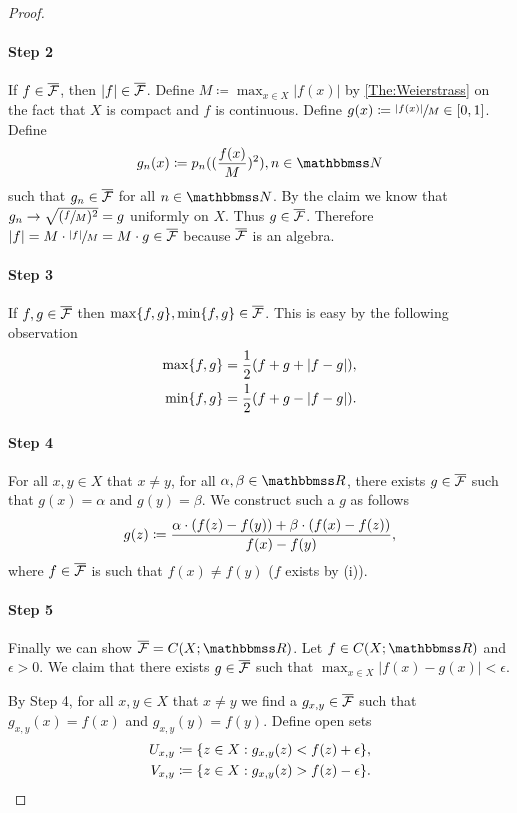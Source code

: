 \documentclass[screen,single]{techreport}
\numberwithin{equation}{section}
\begin{document}
\begin{proof}
  \paragraph{Step 2} If $f \in \overline{\mathcal{F}}$, then $|f| \in \overline{\mathcal{F}}$.
  Define $M \coloneqq \max_{x \in X} |f(x)|$ by \cref{The:Weierstrass} on the fact that $X$ is compact and $f$ is continuous.
  Define $g(x) \coloneqq \sfrac{|f(x)|}{M} \in [0,1]$.
  Define
  \[
  g_n(x) \coloneqq p_n\p{ \p{\frac{f(x)}{M}}^2 }, n \in \bbN
  \]
  such that $g_n \in \overline{\mathcal{F}}$ for all $n \in \bbN$.
  By the claim we know that $g_n \rightarrow \sqrt{({\sfrac{f}{M} })^2} = g$ uniformly on $X$.
  Thus $g \in \overline{\mathcal{F}}$. Therefore $|f| = M \cdot \sfrac{|f|}{M} = M \cdot g \in \overline{\mathcal{F}}$ because $\overline{\mathcal{F}}$ is an algebra.
  
  \paragraph{Step 3} If $f,g\in \overline{\mathcal{F}}$ then $\max\{f,g\},\min\{f,g\} \in \overline{\mathcal{F}}$.
  This is easy by the following observation
  \begin{align*}
    \max\{f,g\} & = \frac{1}{2} ({ f+g+|f-g| }), \\
    \min\{f,g\} & = \frac{1}{2} ({ f+g - |f-g| }).
  \end{align*}
  
  \paragraph{Step 4} For all $x,y \in X$ that $x \neq y$, for all $\alpha,\beta \in \bbR$, there exists $g \in \overline{\mathcal{F}}$ such that $g(x) = \alpha$ and $g(y) = \beta$.
  We construct such a $g$ as follows
  \[
  g(z) \coloneqq \frac{\alpha \cdot ({f(z) - f(y)}) + \beta \cdot ({ f(x) - f(z) })}{f(x) - f(y)},
  \]
  where $f \in \overline{\mathcal{F}}$ is such that $f(x) \neq f(y)$ ($f$ exists by (i)).
  
  \paragraph{Step 5} Finally we can show $\overline{\calF} = C(X;\bbR)$.
  Let $f \in C(X;\bbR)$ and $\epsilon > 0$.
  We claim that there exists $g \in \overline{\mathcal{F}}$ such that $\max_{x \in X} |f(x) -  g(x)| < \epsilon$.
  
  By Step 4, for all $x,y \in X$ that $x \neq y$ we find a $g_{x,y} \in \overline{\mathcal{F}}$ such that $g_{x,y}(x) = f(x)$ and $g_{x,y}(y) = f(y)$.
  Define open sets
  \begin{align*}
    U_{x,y} & \coloneqq \{ { z \in X : g_{x,y}(z) < f(z) + \epsilon } \}, \\
    V_{x,y} & \coloneqq \{ {z \in X: g_{x,y}(z) > f(z) - \epsilon } \}.
  \end{align*}
  

\end{proof}
\end{document}
